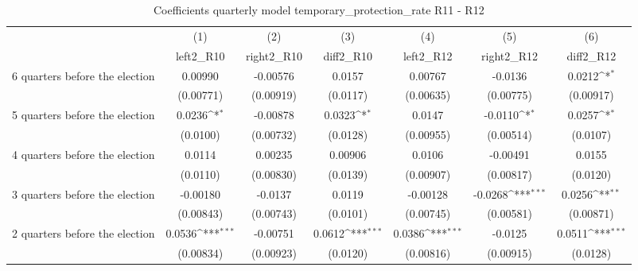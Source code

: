 \begin{table}[!ht]\centering \footnotesize
\def\sym#1{\ifmmode^{#1}\else\(^{#1}\)\fi}
\caption{Coefficients quarterly model temporary\_protection\_rate R11 - R12}
\begin{tabular}{l*{6}{c}}
\hline\hline
                    &\multicolumn{1}{c}{(1)}&\multicolumn{1}{c}{(2)}&\multicolumn{1}{c}{(3)}&\multicolumn{1}{c}{(4)}&\multicolumn{1}{c}{(5)}&\multicolumn{1}{c}{(6)}\\
                    &\multicolumn{1}{c}{left2\_R10}&\multicolumn{1}{c}{right2\_R10}&\multicolumn{1}{c}{diff2\_R10}&\multicolumn{1}{c}{left2\_R12}&\multicolumn{1}{c}{right2\_R12}&\multicolumn{1}{c}{diff2\_R12}\\
\hline
 6 quarters before the election&     0.00990         &    -0.00576         &      0.0157         &     0.00767         &     -0.0136         &      0.0212\sym{*}  \\
                    &   (0.00771)         &   (0.00919)         &    (0.0117)         &   (0.00635)         &   (0.00775)         &   (0.00917)         \\
[1em]
 5 quarters before the election&      0.0236\sym{*}  &    -0.00878         &      0.0323\sym{*}  &      0.0147         &     -0.0110\sym{*}  &      0.0257\sym{*}  \\
                    &    (0.0100)         &   (0.00732)         &    (0.0128)         &   (0.00955)         &   (0.00514)         &    (0.0107)         \\
[1em]
 4 quarters before the election&      0.0114         &     0.00235         &     0.00906         &      0.0106         &    -0.00491         &      0.0155         \\
                    &    (0.0110)         &   (0.00830)         &    (0.0139)         &   (0.00907)         &   (0.00817)         &    (0.0120)         \\
[1em]
 3 quarters before the election&    -0.00180         &     -0.0137         &      0.0119         &    -0.00128         &     -0.0268\sym{***}&      0.0256\sym{**} \\
                    &   (0.00843)         &   (0.00743)         &    (0.0101)         &   (0.00745)         &   (0.00581)         &   (0.00871)         \\
[1em]
 2 quarters before the election&      0.0536\sym{***}&    -0.00751         &      0.0612\sym{***}&      0.0386\sym{***}&     -0.0125         &      0.0511\sym{***}\\
                    &   (0.00834)         &   (0.00923)         &    (0.0120)         &   (0.00816)         &   (0.00915)         &    (0.0128)         \\

\end{tabular}
\end{table}
